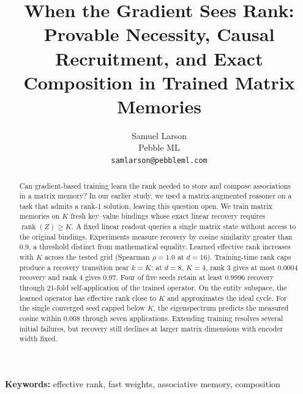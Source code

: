 \documentclass{article}
\title{When the Gradient Sees Rank: Provable
Necessity, Causal Recruitment, and Exact Composition in Trained Matrix
Memories}
\author{%
  Samuel Larson\\
  Pebble ML\\
  \texttt{samlarson@pebbleml.com}%
}
\theoremstyle{plain}
\newcommand{\rank}{\operatorname{rank}}
\begin{document}
\maketitle

\begin{abstract}
Can gradient-based training learn the rank needed to store and compose
associations in a matrix memory? In our earlier study, we used a
matrix-augmented reasoner on a task that admits a rank-1 solution,
leaving this question open. We train matrix memories on $K$ fresh key--value
bindings whose exact linear recovery requires $\rank(Z) \geq K$.
A fixed linear readout queries a single matrix state without access to
the original bindings. Experiments measure recovery by cosine similarity
greater than 0.9, a threshold distinct from mathematical equality.
Learned effective rank increases with $K$ across the tested grid
(Spearman $\rho = 1.0$ at $d = 16$).
Training-time rank caps produce a recovery transition near $k = K$:
at $d = 8$, $K = 4$, rank 3 gives at most 0.0004 recovery and rank 4
gives 0.97.
Four of five seeds retain at least 0.9996 recovery through 21-fold
self-application of the trained operator.
On the entity subspace, the learned operator has effective rank close
to $K$ and approximates the ideal cycle.
For the single converged seed capped below $K$, the eigenspectrum
predicts the measured cosine within 0.008 through seven applications.
Extending training resolves several initial failures, but recovery still
declines at larger matrix dimensions with encoder width fixed.
\end{abstract}

\noindent\textbf{Keywords:} effective rank, fast weights, associative
memory, composition












\end{document}
